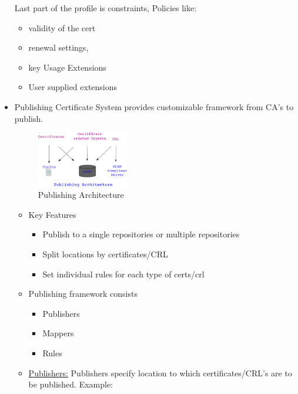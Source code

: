 \documentclass[a4paper]{article}
\begin{document}
\begin{itemize}
            Last part of the profile is constraints, Policies like:
            \begin{itemize}
                \item validity of the cert
                \item renewal settings, 
                \item key Usage Extensions
                \item User supplied extensions
            \end{itemize}
        \item Publishing 
            Certificate System provides customizable framework from CA's to publish.
            \begin{figure}[h!]
                \centering
                \includegraphics[width=40mm]{publishing3.png}
                \caption{Publishing Architecture}
            \end{figure}
            \begin{itemize}
                \item Key Features
                    \begin{itemize}
                        \item Publish to a single repositories or multiple repositories
                        \item Split locations by certificates/CRL
                        \item Set individual rules for each type of certs/crl
                    \end{itemize}
                \item Publishing framework consists
                    \begin{itemize}
                        \item Publishers
                        \item Mappers
                        \item Rules
                    \end{itemize}
                \item \underline{Publishers:}
                    Publishers specify location to which certificates/CRL's are to be published. 
                        Example: 
                        \begin{itemize}

\end{itemize}
\end{itemize}
\end{itemize}
\end{document}
